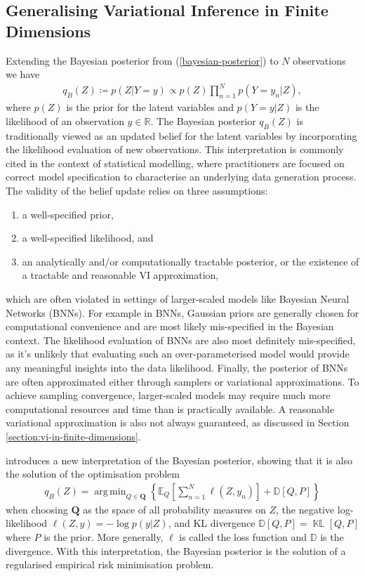 \documentclass{article}
\newcommand{\KLD}{\operatorname{\mathbb{KL}}}
\DeclareMathOperator*{\argmin}{arg\,min}
\numberwithin{equation}{section}
\begin{document}
\subsection{Generalising Variational Inference in Finite Dimensions}
Extending the Bayesian posterior from (\ref{bayesian-posterior}) to $N$ observations we have
\begin{align}
    \label{bayesian-posterior-gvi}
    q_B(Z) \coloneqq p(Z\vert Y=y) \propto p(Z) \prod_{n=1}^N p(Y=y_n \vert Z),
\end{align}
where $p(Z)$ is the prior for the latent variables and $p(Y=y \vert Z)$ is the likelihood of an observation $y \in \mathbb{R}$.
The Bayesian posterior $q_B(Z)$ is traditionally viewed as an updated belief for the latent variables by incorporating the likelihood evaluation of new observations.
This interpretation is commonly cited in the context of statistical modelling, where practitioners are focused on correct model specification to characterise an underlying data generation process. The validity of the belief update relies on three assumptions:
\begin{enumerate}
    \item a well-specified prior,
    \item a well-specified likelihood, and
    \item an analytically and/or computationally tractable posterior, or the existence of a tractable and reasonable VI approximation,
\end{enumerate}
which are often violated in settings of larger-scaled models like Bayesian Neural Networks (BNNs).
For example in BNNs, Gaussian priors are generally chosen for computational convenience and are most likely mis-specified in the Bayesian context.
The likelihood evaluation of BNNs are also most definitely mis-specified, as it's unlikely that evaluating such an over-parameterised model would provide any meaningful insights into the data likelihood.
Finally, the posterior of BNNs are often approximated either through samplers or variational approximations.
To achieve sampling convergence, larger-scaled models may require much more computational resources and time than is practically available.
A reasonable variational approximation is also not always guaranteed, as discussed in Section \ref{section:vi-in-finite-dimensions}.

\cite{knoblauch2022optimization} introduces a new interpretation of the Bayesian posterior, showing that it is also the solution of the optimisation problem
\begin{align}
    q_B(Z) = \argmin_{Q \in \boldsymbol{Q}} \left\{\mathbb{E}_{Q}\left[\sum_{n=1}^N \ell \left(Z, y_n\right)\right] + \mathbb{D}\left[Q, P\right]\right\}
    \label{gvi-posterior}
\end{align}
when choosing $\boldsymbol{Q}$ as the space of all probability measures on $Z$, the negative log-likelihood $\ell(Z, y) =-\log p\left(y \vert Z\right)$,  and KL divergence $\mathbb{D}\left[Q, P\right] = \KLD\left[Q, P\right]$ where $P$ is the prior.
More generally, $\ell$ is called the loss function and $\mathbb{D}$ is the divergence. With this interpretation, the Bayesian posterior is the solution of a regularised empirical risk minimisation problem.
\end{document}
